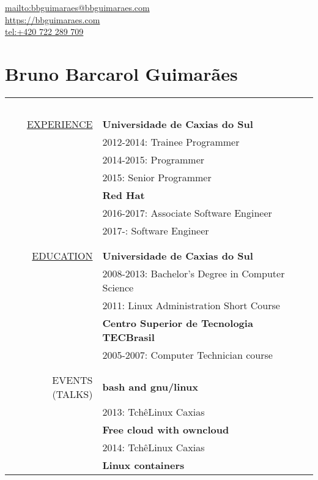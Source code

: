 \begin{flushright}
    \url{mailto:bbguimaraes@bbguimaraes.com} \\
    \url{https://bbguimaraes.com} \\
    \url{tel:+420 722 289 709}
\end{flushright}

\section*{Bruno Barcarol Guimarães}
\bigskip

\begin{center}

\begin{tabular}{rl}
    \multicolumn{2}{c}{~\hspace{.95\textwidth}~} \\
    \hspace{5em}
    \hyperref[sec:professional]{\uppercase{Experience}}
    & \textbf{Universidade de Caxias do Sul} \\
    & 2012-2014: Trainee Programmer \\
    & 2014-2015: Programmer \\
    & 2015: Senior Programmer \\
    & \textbf{Red Hat} \\
    & 2016-2017: Associate Software Engineer \\
    & 2017-: Software Engineer
    \\\\ \hline \\
    \hyperref[sec:education]{\uppercase{Education}}
    & \textbf{Universidade de Caxias do Sul} \\
    & 2008-2013: Bachelor's Degree in Computer Science \\
    & 2011: Linux Administration Short Course \\
    & \textbf{Centro Superior de Tecnologia TECBrasil} \\
    & 2005-2007: Computer Technician course \\
    \\ \hline \\
    \uppercase{Events (talks)}
    & \textbf{bash and gnu/linux} \\
    & 2013: TchêLinux Caxias \\
    & \textbf{Free cloud with owncloud} \\
    & 2014: TchêLinux Caxias \\
    & \textbf{Linux containers} \\

\end{tabular}
\end{center}
